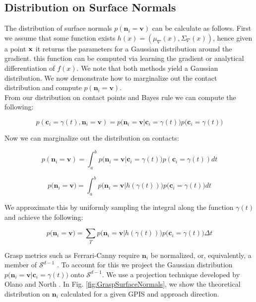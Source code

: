 \documentclass[letterpaper, 10 pt, conference]{ieeeconf}  %
\begin{document}
\subsection{Distribution on Surface Normals} 
The distribution of surface normals $p(\textbf{n}_i = \textbf{v})$ can be calculate as follows.
First we assume that some function exists $h(x) = ( \mu_{\nabla}(x), \Sigma_{\nabla}(x) )$, hence given a point $\bf{x}$ it returns the parameters for a Gaussian distribution around the gradient.
this function can be computed via learning the gradient \cite{solak2003derivative} or analytical differentiation of $f(x)$.
We note that both methods yield a Gaussian distribution.
We now demonstrate how to marginalize out the contact distribution and compute $p(\textbf{n}_i = \textbf{v})$.\\

From our distribution on contact points and Bayes rule we can compute the following: 

\begin{equation}
p(\textbf{c}_i = \gamma(t), \textbf{n}_i = \textbf{v}) = p\big(\textbf{n}_i = \textbf{v} | \textbf{c}_i = \gamma(t) \big)p\big(\textbf{c}_i = \gamma(t)\big)
\end{equation}

Now we can marginalize out the distribution on contacts:

\begin{equation}
p(\textbf{n}_i = \textbf{v}) = \int_a^b  p \big(\textbf{n}_i = \textbf{v} | \textbf{c}_i = \gamma(t) \big)p(\textbf{c}_i = \gamma(t)) dt
\end{equation}

\begin{equation}
p\big(\textbf{n}_i = \textbf{v}\big) = \int_a^b  p \big(\textbf{n}_i = \textbf{v} | h(\gamma(t))\big)p\big(\textbf{c}_i = \gamma(t)\big) dt
\end{equation}

We approximate this by uniformly sampling the integral along the function $\gamma(t)$ and achieve the following: 

\begin{equation}
p\big( \textbf{n}_i = \textbf{v} \big) = \sum_T  p \big( \textbf{n}_i = \textbf{v} | h(\gamma(t)) \big) p\big(\textbf{c}_i = \gamma(t)\big) \Delta t
\end{equation}


Grasp metrics such as  Ferrari-Canny require $\textbf{n}_i$ be normalized, or, equivalently, a member of $\mathcal{S}^{d-1}$ \cite{ferrari1992}. To account for this we project the Gaussian distribution $p \big(\textbf{n}_i = \textbf{v} |\textbf{c}_i = \gamma(t) \big)$  onto $\mathcal{S}^{d-1}$. We use a projection technique developed by Olano and North \cite{olano1997normal}. In Fig.
\ref{fig:GraspSurfaceNormals}, we show the theoretical distribution on $\textbf{n}_i$ calculated for a given GPIS and approach direction.
\end{document}
